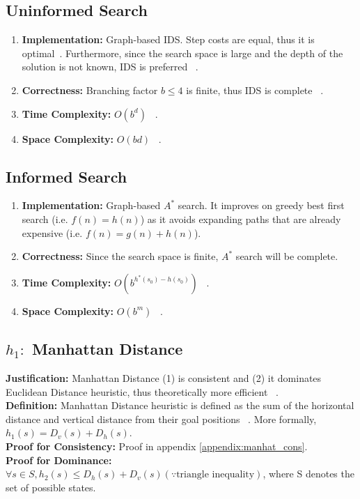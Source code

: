 \documentclass[runningheads]{llncs}
\begin{document}
\subsection{Uninformed Search}
\begin{enumerate}
    \item \textbf{Implementation:} Graph-based IDS. Step costs are equal, thus it is optimal~\cite[p88]{stuart_russell_artifical_2010}. Furthermore, since the search space is large and the depth of the solution is not known, IDS is preferred ~\cite[p90]{stuart_russell_artifical_2010}.
    \item \textbf{Correctness:} Branching factor \( b \leq 4 \) is finite, thus IDS is complete ~\cite[p88-90]{stuart_russell_artifical_2010}. 
    \item \textbf{Time Complexity:} \( O(b^d) \) ~\cite[p88-90]{stuart_russell_artifical_2010}.
    \item \textbf{Space Complexity:} \( O(bd) \) ~\cite[p88-90]{stuart_russell_artifical_2010}.
\end{enumerate}

\subsection{Informed Search}
\begin{enumerate}
    \item \textbf{Implementation:} Graph-based \( A^* \) search. It improves on greedy best first search (i.e. \( f(n) = h(n) \)) as it avoids expanding paths that are already expensive (i.e. \( f(n) = g(n) + h(n) \)).
    \item \textbf{Correctness:} Since the search space is finite, \( A^* \) search will be complete.
    \item \textbf{Time Complexity:} \( O(b^{h^*(s_0) - h(s_0)}) \) ~\cite[p93-99]{stuart_russell_artifical_2010}.
    \item \textbf{Space Complexity:} \( O(b^m) \) ~\cite[p93-99]{stuart_russell_artifical_2010}.
\end{enumerate}

\subsection{\(h_1:\) Manhattan Distance} 
\textbf{Justification:} Manhattan Distance (1) is consistent and (2) it dominates Euclidean Distance heuristic, thus theoretically more efficient ~\cite[104]{stuart_russell_artifical_2010}. \\
\textbf{Definition:} Manhattan Distance heuristic is defined as the sum of the horizontal distance and vertical distance from their goal positions ~\cite[p103]{stuart_russell_artifical_2010}. More formally, \( h_1(s) = D_v(s) + D_h(s) \). \\
\textbf{Proof for Consistency:} Proof in appendix \ref{appendix:manhat_cons}. \\
\textbf{Proof for Dominance:} \( \forall s \in S, h_{2}(s) \leq D_h(s) + D_v(s) (\because \text{triangle inequality}) \), where S denotes the set of possible states.
\end{document}
